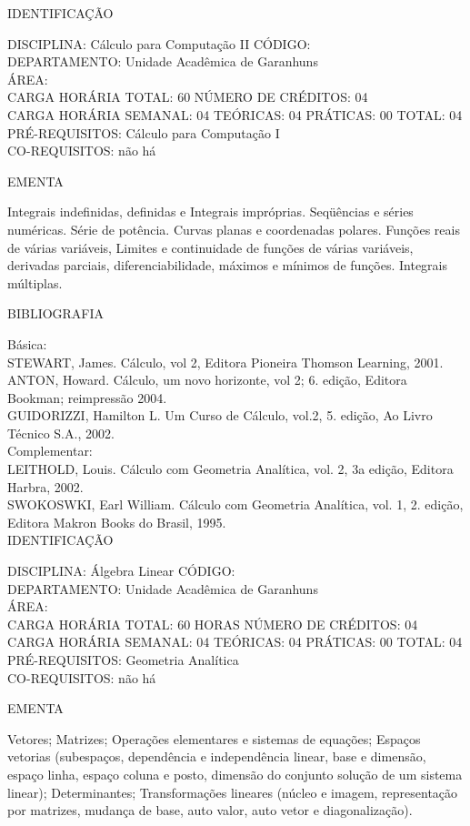 \documentclass[
	12pt,				%
	openright,			%
  oneside,     %
	a4paper,			%
	chapter=TITLE,		%
	english,			%
	french,				%
	spanish,			%
	brazil				%
	]{abntex2}
\begin{document}
\begin{apendicesenv}
IDENTIFICAÇÃO

DISCIPLINA: Cálculo para Computação II CÓDIGO:\\ 
DEPARTAMENTO: Unidade Acadêmica de Garanhuns\\
ÁREA: \\
CARGA HORÁRIA TOTAL: 60 NÚMERO DE CRÉDITOS: 04\\
CARGA HORÁRIA SEMANAL: 04 TEÓRICAS: 04 PRÁTICAS: 00 TOTAL: 04\\
PRÉ-REQUISITOS: Cálculo para Computação I\\
CO-REQUISITOS: não há

EMENTA 

Integrais indefinidas, definidas e Integrais impróprias. Seqüências e
séries numéricas. Série de potência. Curvas planas e coordenadas
polares. Funções reais de várias variáveis, Limites e continuidade de
funções de várias variáveis, derivadas parciais, diferenciabilidade,
máximos e mínimos de funções. Integrais múltiplas.

BIBLIOGRAFIA 

Básica: \\
STEWART, James. Cálculo, vol 2, Editora Pioneira Thomson Learning, 2001.\\
ANTON, Howard. Cálculo, um novo horizonte, vol 2; 6. edição, Editora
Bookman; reimpressão 2004.\\
GUIDORIZZI, Hamilton L. Um Curso de Cálculo, vol.2, 5. edição, Ao Livro
Técnico S.A., 2002.\\
Complementar:\\
LEITHOLD, Louis. Cálculo com Geometria Analítica, vol. 2, 3a edição,
Editora Harbra, 2002.\\
SWOKOSWKI, Earl William. Cálculo com Geometria Analítica, vol. 1, 2.
edição, Editora Makron Books do Brasil, 1995.\\


\newpage IDENTIFICAÇÃO

DISCIPLINA: Álgebra Linear CÓDIGO:\\ 
DEPARTAMENTO: Unidade Acadêmica de Garanhuns\\
ÁREA: \\
CARGA HORÁRIA TOTAL: 60 HORAS NÚMERO DE CRÉDITOS: 04\\
CARGA HORÁRIA SEMANAL: 04 TEÓRICAS: 04 PRÁTICAS: 00 TOTAL: 04\\
PRÉ-REQUISITOS: Geometria Analítica\\
CO-REQUISITOS: não há

EMENTA 

Vetores; Matrizes; Operações elementares e sistemas de equações; Espaços vetorias (subespaços, dependência e independência linear, base e
dimensão, espaço linha, espaço coluna e posto, dimensão do conjunto solução de um sistema linear); Determinantes; Transformações lineares
(núcleo e imagem, representação por matrizes, mudança de base, auto valor, auto vetor e diagonalização).


\end{apendicesenv}
\end{document}
